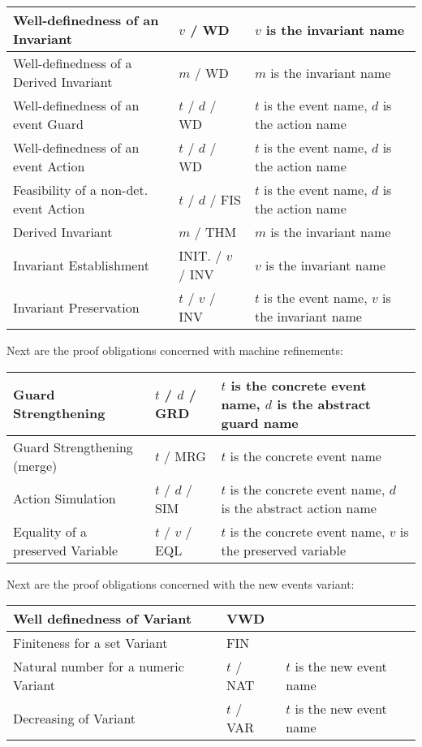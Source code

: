 \begin{center}
    \begin{tabular}{| p{6cm} | p{3cm} | p{5cm} |}
    \hline
	Well-definedness of an Invariant & $v$  / WD & $v$ is the invariant name\\ \hline
	Well-definedness of a Derived Invariant & $m$  / WD & $m$ is the invariant name \\ \hline
	Well-definedness of an event Guard & $t$  / $d$  / WD & $t$ is the event name, $d$ is the action name  \\ \hline
	Well-definedness of an event Action & $t$  / $d$  / WD & $t$ is the event name, $d$ is the action name  \\ \hline
	Feasibility of a non-det. event Action & $t$  / $d$  / FIS & $t$ is the event name, $d$ is the action name  \\ \hline
	Derived Invariant & $m$ / THM & $m$ is the invariant name \\ \hline
	Invariant Establishment & INIT.  / $v$  / INV & $v$ is the invariant name  \\ \hline
	Invariant Preservation & $t$  / $v$  / INV & $t$ is the event name, $v$ is the invariant name  \\ \hline
    \end{tabular}
\end{center}

Next are the proof obligations concerned with machine refinements:

\begin{center}
    \begin{tabular}{| p{6cm} | p{3cm} | p{5cm} |}
    \hline
	Guard Strengthening & $t$  / $d$  / GRD & $t$ is the concrete event name, $d$ is the abstract guard name\\ \hline
	Guard Strengthening (merge) & $t$  / MRG & $t$ is the concrete event name \\ \hline
	Action Simulation & $t$  / $d$  / SIM & $t$ is the concrete event name, $d$ is the abstract action name  \\ \hline
	Equality of a preserved Variable & $t$  / $v$  / EQL & $t$ is the concrete event name, $v$ is the preserved variable  \\ \hline
    \end{tabular}
\end{center}

Next are the proof obligations concerned with the new events variant:

\begin{center}
    \begin{tabular}{| p{6cm} | p{3cm} | p{5cm} |}
    \hline
	Well definedness of Variant & VWD & \\ \hline
	Finiteness for a set Variant & FIN &  \\ \hline
	Natural number for a numeric Variant & $t$  / NAT & $t$ is the new event name \\ \hline
	Decreasing of Variant & $t$  / VAR & $t$ is the new event name  \\ \hline
    \end{tabular}
\end{center}

